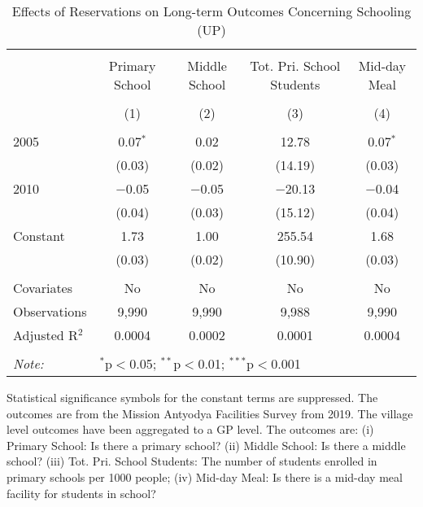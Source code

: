 \begin{table}[!htbp]
\centering
\begin{threeparttable}

  \caption{Effects of Reservations on Long-term Outcomes Concerning Schooling (UP)} 
  \label{up_shrug_schooling_05_10} 
\scriptsize 
\begin{tabular}{@{\extracolsep{0pt}}lcccc} 
\\[-1.8ex]\hline 
\hline \\[-1.8ex] 
 & Primary School & Middle School & Tot. Pri. School Students & Mid-day Meal \\ 
\\[-1.8ex] & (1) & (2) & (3) & (4)\\ 
\hline \\[-1.8ex] 
 2005 & 0.07$^{*}$ & 0.02 & 12.78 & 0.07$^{*}$ \\ 
  & (0.03) & (0.02) & (14.19) & (0.03) \\ 
  2010 & $-$0.05 & $-$0.05 & $-$20.13 & $-$0.04 \\ 
  & (0.04) & (0.03) & (15.12) & (0.04) \\ 
  Constant & 1.73 & 1.00 & 255.54 & 1.68 \\ 
  & (0.03) & (0.02) & (10.90) & (0.03) \\ 
 \hline \\[-1.8ex] 
Covariates & No & No & No & No \\ 
Observations & 9,990 & 9,990 & 9,988 & 9,990 \\ 
Adjusted R$^{2}$ & 0.0004 & 0.0002 & 0.0001 & 0.0004 \\ 
\hline 
\hline \\[-1.8ex] 
\textit{Note:}  & \multicolumn{4}{l}{$^{*}$p$<$0.05; $^{**}$p$<$0.01; $^{***}$p$<$0.001} \\ 
\end{tabular} 
\begin{tablenotes}[flushleft]
\scriptsize
\item Statistical significance symbols for the constant terms are suppressed. The outcomes are from the Mission Antyodya Facilities Survey from 2019. 
                     The village level outcomes have been aggregated to a GP level. 
                     The outcomes are:
                         (i) Primary School: Is there a primary school?
                         (ii) Middle School: Is there a middle school?
                         (iii) Tot. Pri. School Students: The number of students enrolled in primary schools per 1000 people;
                         (iv) Mid-day Meal: Is there is a mid-day meal facility for students in school?
\end{tablenotes}
\end{threeparttable}
\end{table}
